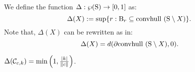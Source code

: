 

We define the function $\Delta: \wp(\text{S}) \to [0,1]$ as:
\begin{equation}\label{shrinkage}
\Delta(X) := \sup \{r: \text{B}_r \subseteq \mbox{convhull }(\text{S} \setminus X)\}.\end{equation}
Note that, $\Delta(X)$ can be rewritten as in:
\begin{equation}\label{shrinkage2}
\Delta(X) =  d(\partial  \mbox{convhull }(\text{S} \setminus X), 0).
\end{equation}


\begin{lemma}\label{lemma:delta2}$\Delta(\mathcal{C}_{c,k}) = \min\left(1, \frac{|k|}{\|c\|}\right)$.
\end{lemma}

